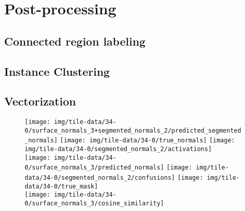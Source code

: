 \chapter{Post-processing}%
\label{chap:post-processing}



\newpage
\section{Connected region labeling}%
\label{sec:connected-region-labeling}


\newpage
\section{Instance Clustering}%
\label{sec:instance-clustering}


\section{Vectorization}%
\label{sec:vectorization}


\begin{figure}
  \centering
  \texttt{[image: img/tile-data/34-0/surface\_normals\_3+segmented\_normals\_2/predicted\_segmented\_normals]}
  \texttt{[image: img/tile-data/34-0/true\_normals]}
  \texttt{[image: img/tile-data/34-0/segmented\_normals\_2/activations]}
  \\
  \texttt{[image: img/tile-data/34-0/surface\_normals\_3/predicted\_normals]}
  \texttt{[image: img/tile-data/34-0/segmented\_normals\_2/confusions]}
  \texttt{[image: img/tile-data/34-0/true\_mask]}
  \\
  \hspace{2.15em}\texttt{[image: img/tile-data/34-0/surface\_normals\_3/cosine\_similarity]}
\end{figure}
